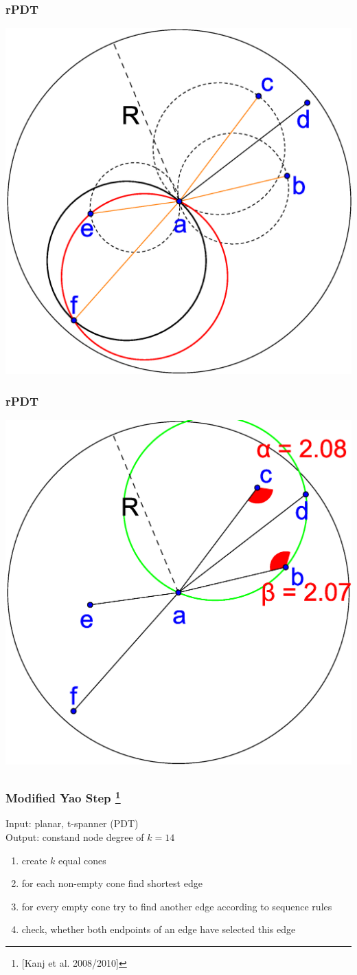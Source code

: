\documentclass[compress]{beamer}
\begin{document}
\begin{frame} 
\frametitle{rPDT}
\center \includegraphics[width=0.7\linewidth]{PDT_3.eps}
\end{frame}


\begin{frame}
\frametitle{rPDT}
\center \includegraphics[width=0.7\linewidth]{PDT_angle.eps}
\end{frame}

\subsection{}
\begin{frame}
\frametitle{Modified Yao Step \footnote{[Kanj et al. 2008/2010]}}
Input: planar, t-spanner (PDT)\\
Output: constand node degree of $k = 14 $
	\begin{enumerate}
		\item create $k $ equal cones
		\item for each non-empty cone find shortest edge
		\item for every empty cone try to find another edge according to sequence rules
		\item check, whether both endpoints of an edge have selected this edge
	\end{enumerate}
\end{frame}
\end{document}
